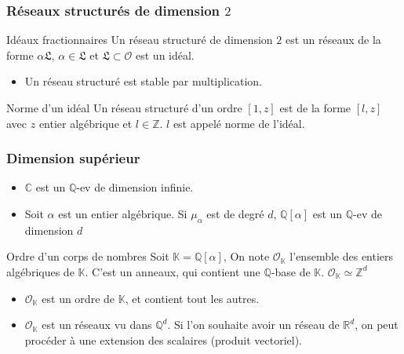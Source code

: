 \documentclass[11pt]{beamer}
\newcommand{\Z}[0]{\mathbb{Z}}
\newcommand{\Q}[0]{\mathbb{Q}}
\newcommand{\R}[0]{\mathbb{R}}
\newcommand{\C}[0]{\mathbb{C}}
\newcommand{\K}[0]{\mathbb{K}}
\newcommand{\LR}[0]{\mathfrak{L}}
\newcommand{\OR}[0]{\mathcal{O}}
\begin{document}
	\begin{frame}
		\frametitle{Réseaux structurés de dimension $2$}
		
		\begin{block}{Idéaux fractionnaires}
			Un réseau structuré de dimension $2$ est un réseaux de la forme $\alpha\LR$, $\alpha\in\LR$ et $\LR\subset\OR$ est un idéal.
		\end{block}
		\begin{itemize}
			\item Un réseau structuré est stable par multiplication. 
		\end{itemize}
		\begin{block}{Norme d'un idéal}
			Un réseau structuré d'un ordre $[1,z]$ est de la forme $[l,z]$ avec $z$ entier algébrique et $l\in\Z$. $l$ est appelé norme de l'idéal.
		\end{block}
	\end{frame}
	
	\begin{frame}
		\frametitle{Dimension supérieur }
		\begin{itemize}
			\item $\C$ est un $\Q$-ev de dimension infinie.
			\item Soit $\alpha$ est un entier algébrique. Si $\mu_\alpha$ est de degré $d$, $\Q[\alpha]$ est un $\Q$-ev de dimension $d$
		\end{itemize}
		\begin{block}{Ordre d'un corps de nombres}
			Soit $\K = \Q[\alpha]$, On note $\OR_\K$ l'ensemble des entiers algébriques de $\K$. C'est un anneaux, qui contient une $\Q$-base de $\K$. $\OR_\K\simeq\Z^d$
		\end{block}
		\begin{itemize}
			\item $\OR_\K$ est un ordre de $\K$, et contient tout les autres.
			\item $\OR_\K$ est un réseaux vu dans $\Q^d$. Si l'on souhaite avoir un réseau de $\R^d$, on peut procéder à une extension des scalaires (produit vectoriel).
		\end{itemize}
	\end{frame}
	
\end{document}
